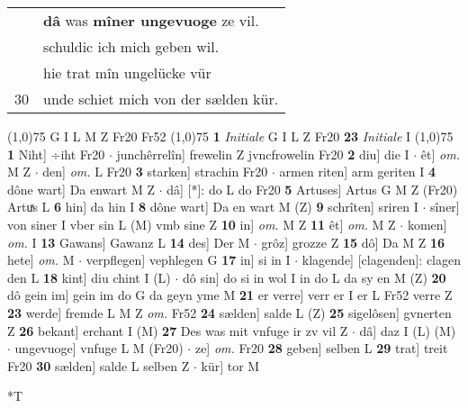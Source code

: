 \documentclass[8pt,a4paper,notitlepage]{article}
\begin{document}
\begin{table}[ht]
\begin{minipage}[t]{0.5\linewidth}
\begin{tabular}{rl}
 & \textbf{dâ} was \textbf{mîner ungevuoge} ze vil.\\ 
 & schuldic ich mich geben wil.\\ 
 & hie trat mîn ungelücke vür\\ 
30 & unde schiet mich von der sælden kür.\\ 
\end{tabular}
\scriptsize
\line(1,0){75} \newline
G I L M Z Fr20 Fr52 \newline
\line(1,0){75} \newline
\textbf{1} \textit{Initiale} G I L Z Fr20  \textbf{23} \textit{Initiale} I  \newline
\line(1,0){75} \newline
\textbf{1} Niht] ÷iht Fr20  $\cdot$ junchêrrelîn] frewelin Z jvncfrowelin Fr20 \textbf{2} diu] die I  $\cdot$ êt] \textit{om.} M Z  $\cdot$ den] \textit{om.} L Fr20 \textbf{3} starken] strachin Fr20  $\cdot$ armen riten] arm geriten I \textbf{4} dône wart] Da enwart M Z  $\cdot$ dâ] [*]: do L do Fr20 \textbf{5} Artuses] Artus G M Z (Fr20) Artuͯs L \textbf{6} hin] da hin I \textbf{8} dône wart] Da en wart M (Z) \textbf{9} schrîten] sriren I  $\cdot$ sîner] von siner I vber sin L (M) vmb sine Z \textbf{10} in] \textit{om.} M Z \textbf{11} êt] \textit{om.} M Z  $\cdot$ komen] \textit{om.} I \textbf{13} Gawans] Gawanz L \textbf{14} des] Der M  $\cdot$ grôz] grozze Z \textbf{15} dô] Da M Z \textbf{16} hete] \textit{om.} M  $\cdot$ verpflegen] vephlegen G \textbf{17} in] si in I  $\cdot$ klagende] [clagenden]: clagen den L \textbf{18} kint] diu chint I (L)  $\cdot$ dô sin] do si in wol I in do L da sy en M (Z) \textbf{20} dô gein im] gein im do G da geyn yme M \textbf{21} er verre] verr er I er L Fr52 verre Z \textbf{23} werde] fremde L M Z \textit{om.} Fr52 \textbf{24} sælden] salde L (Z) \textbf{25} sigelôsen] gvnerten Z \textbf{26} bekant] erchant I (M) \textbf{27} Des was mit vnfuge ir zv vil Z  $\cdot$ dâ] daz I (L) (M)  $\cdot$ ungevuoge] vnfuge L M (Fr20)  $\cdot$ ze] \textit{om.} Fr20 \textbf{28} geben] selben L \textbf{29} trat] treit Fr20 \textbf{30} sælden] salde L selben Z  $\cdot$ kür] tor M \newline
\end{minipage}
\hspace{0.5cm}
\begin{minipage}[t]{0.5\linewidth}
\small
\begin{center}*T
\end{center}
\begin{tabular}{rl}

\end{tabular}
\end{minipage}
\end{table}
\end{document}
